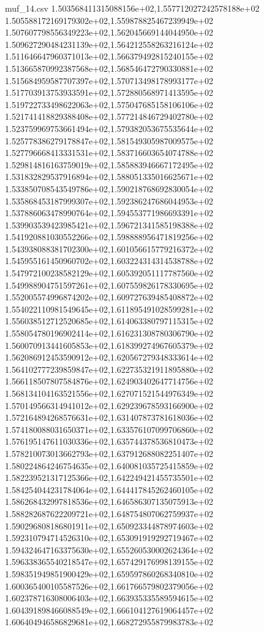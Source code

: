 \begin{filecontents*}{muf_14.csv}
1.503568411315088156e+02,1.557712027242578188e+02
1.505588172169179302e+02,1.559878825467239949e+02
1.507607798556349223e+02,1.562045669144044950e+02
1.509627290484231139e+02,1.564212558263216124e+02
1.511646647960371013e+02,1.566379492815240155e+02
1.513665870992387568e+02,1.568546472790330881e+02
1.515684959587707397e+02,1.570713498178993177e+02
1.517703913753933591e+02,1.572880568971413595e+02
1.519722733498622063e+02,1.575047685158106106e+02
1.521741418829388408e+02,1.577214846729402780e+02
1.523759969753661494e+02,1.579382053675535644e+02
1.525778386279178847e+02,1.581549305987009575e+02
1.527796668413331531e+02,1.583716603654074788e+02
1.529814816163759019e+02,1.585883946667172495e+02
1.531832829537916894e+02,1.588051335016625671e+02
1.533850708543549786e+02,1.590218768692830054e+02
1.535868453187999307e+02,1.592386247686044953e+02
1.537886063478990764e+02,1.594553771986693391e+02
1.539903539423985421e+02,1.596721341585198388e+02
1.541920881030552266e+02,1.598888956471819256e+02
1.543938088381702300e+02,1.601056615779216372e+02
1.545955161450960702e+02,1.603224314314538788e+02
1.547972100238582129e+02,1.605392051117787560e+02
1.549988904751597261e+02,1.607559826178330695e+02
1.552005574996874202e+02,1.609727639485408872e+02
1.554022110981549645e+02,1.611895491028599281e+02
1.556038512712520685e+02,1.614063380797115315e+02
1.558054780196902414e+02,1.616231308780306790e+02
1.560070913441605853e+02,1.618399274967605379e+02
1.562086912453590912e+02,1.620567279348333614e+02
1.564102777239859847e+02,1.622735321911895880e+02
1.566118507807584876e+02,1.624903402647714756e+02
1.568134104163521556e+02,1.627071521544976349e+02
1.570149566314941012e+02,1.629239678593166900e+02
1.572164894268576631e+02,1.631407873781618036e+02
1.574180088031650371e+02,1.633576107099706860e+02
1.576195147611030336e+02,1.635744378536810473e+02
1.578210073013662793e+02,1.637912688082251407e+02
1.580224864246754635e+02,1.640081035725415859e+02
1.582239521317125366e+02,1.642249421455735501e+02
1.584254044231784064e+02,1.644417845262460105e+02
1.586268432997818536e+02,1.646586307135075913e+02
1.588282687622209721e+02,1.648754807062759937e+02
1.590296808186801911e+02,1.650923344878974603e+02
1.592310794714526310e+02,1.653091919292719467e+02
1.594324647163375630e+02,1.655260530002624364e+02
1.596338365540218547e+02,1.657429176998139155e+02
1.598351949851900429e+02,1.659597860268340810e+02
1.600365400105587526e+02,1.661766579802379056e+02
1.602378716308006403e+02,1.663935335589594615e+02
1.604391898466088549e+02,1.666104127619064457e+02
1.606404946586829681e+02,1.668272955879983783e+02

\end{filecontents*}
